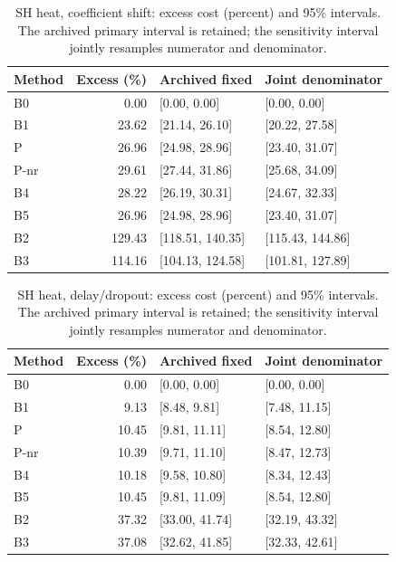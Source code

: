 \begin{table}[ht]
\caption{SH heat, coefficient shift: excess cost (percent) and 95\% intervals. The archived primary interval is retained; the sensitivity interval jointly resamples numerator and denominator.}\label{tab:joint_heat_locked_coefficient_ood}
\centering\small
\begin{tabular}{@{}lrll@{}}\toprule
Method & Excess (\%) & Archived fixed & Joint denominator\\\midrule
B0 & 0.00 & [0.00, 0.00] & [0.00, 0.00] \\
B1 & 23.62 & [21.14, 26.10] & [20.22, 27.58] \\
P & 26.96 & [24.98, 28.96] & [23.40, 31.07] \\
P-nr & 29.61 & [27.44, 31.86] & [25.68, 34.09] \\
B4 & 28.22 & [26.19, 30.31] & [24.67, 32.33] \\
B5 & 26.96 & [24.98, 28.96] & [23.40, 31.07] \\
B2 & 129.43 & [118.51, 140.35] & [115.43, 144.86] \\
B3 & 114.16 & [104.13, 124.58] & [101.81, 127.89] \\
\bottomrule\end{tabular}
\end{table}
\begin{table}[ht]
\caption{SH heat, delay/dropout: excess cost (percent) and 95\% intervals. The archived primary interval is retained; the sensitivity interval jointly resamples numerator and denominator.}\label{tab:joint_heat_locked_delay_dropout}
\centering\small
\begin{tabular}{@{}lrll@{}}\toprule
Method & Excess (\%) & Archived fixed & Joint denominator\\\midrule
B0 & 0.00 & [0.00, 0.00] & [0.00, 0.00] \\
B1 & 9.13 & [8.48, 9.81] & [7.48, 11.15] \\
P & 10.45 & [9.81, 11.11] & [8.54, 12.80] \\
P-nr & 10.39 & [9.71, 11.10] & [8.47, 12.73] \\
B4 & 10.18 & [9.58, 10.80] & [8.34, 12.43] \\
B5 & 10.45 & [9.81, 11.09] & [8.54, 12.80] \\
B2 & 37.32 & [33.00, 41.74] & [32.19, 43.32] \\
B3 & 37.08 & [32.62, 41.85] & [32.33, 42.61] \\
\bottomrule\end{tabular}
\end{table}
